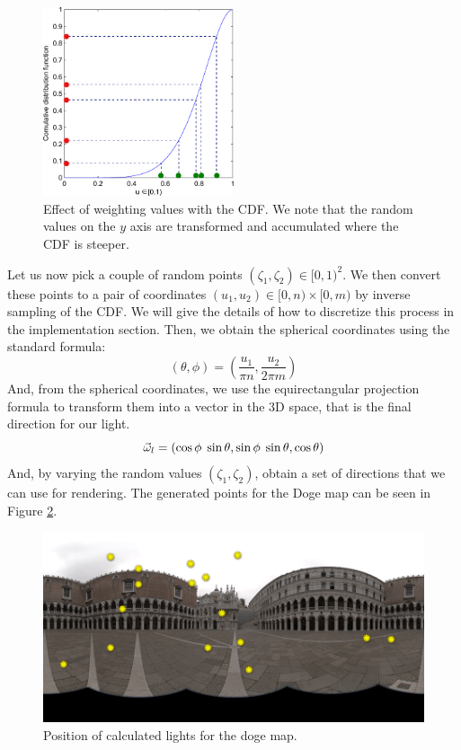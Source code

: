 \begin{figure}[!ht]
\centering
\includegraphics[width=0.5\textwidth]{images/matlab/cdfex.pdf}
\caption{Effect of weighting values with the CDF. We note that the random values on the $y$ axis are transformed and accumulated where the CDF is steeper.}
\label{fig:cdfweight}
\end{figure}
Let us now pick a couple of random points $(\zeta_1,\zeta_2) \in [0,1)^2$. We then convert these points to a pair of coordinates $(u_1,u_2) \in [0,n)\times[0,m)$ by inverse sampling of the CDF. We will give the details of how to discretize this process in the implementation section. Then, we obtain the spherical coordinates using the standard formula:
$$
(\theta, \phi) = \left(\frac{u_1}{\pi n}, \frac{u_2}{2 \pi m}\right)
$$
And, from the spherical coordinates, we use the equirectangular projection formula to transform them into a vector in the 3D space, that is the final direction for our light.
$$
\vec{\omega}_l = (\cos\phi\;\sin\theta, \sin\phi\;\sin\theta, \cos\theta)
$$
And, by varying the random values $(\zeta_1,\zeta_2)$, obtain a set of directions that we can use for rendering. The generated points for the Doge map can be seen in Figure \ref{fig:doge_lights}.
\begin{figure}[!h]
\centering
\includegraphics[width=\textwidth]{images/matlab/doge2_lights.png}
\caption{Position of calculated lights for the doge map.}
\label{fig:doge_lights}
\end{figure}